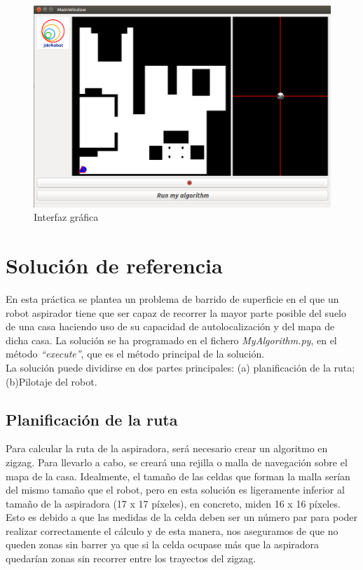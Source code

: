 \begin{figure}[H]
  \begin{center}
    \includegraphics[width=1.0\textwidth]{figures/Vacuum/vacuumGUI.png}
		\caption{Interfaz gráfica}
		\label{fig.vacuumGUI}
		\end{center}
\end{figure}



\section{Solución de referencia} 
En esta práctica se plantea un problema de barrido de superficie en el que un robot aspirador tiene que ser capaz de recorrer la mayor parte posible del suelo de una casa haciendo uso de su capacidad de autolocalización y del mapa de dicha casa. La solución se ha programado en el fichero \textit{MyAlgorithm.py}, en el método \textit{``execute''}, que es el método principal de la solución. \\

La solución puede dividirse en dos partes principales: (a) planificación de la ruta; (b)Pilotaje del robot. 

\subsection{Planificación de la ruta}

Para calcular la ruta de la aspiradora, será necesario crear un algoritmo en zigzag. Para llevarlo a cabo, se creará una rejilla o malla de navegación sobre el mapa de la casa. Idealmente, el tamaño de las celdas que forman la malla serían del mismo tamaño que el robot, pero en esta solución es ligeramente inferior al tamaño de la aspiradora (17 x 17 píxeles), en concreto, miden 16 x 16 píxeles. Esto es debido a que las medidas de la celda deben ser un número par para poder realizar correctamente el cálculo y de esta manera, nos aseguramos de que no queden zonas sin barrer ya que si la celda ocupase más que la aspiradora quedarían zonas sin recorrer entre los trayectos del zigzag. \\

